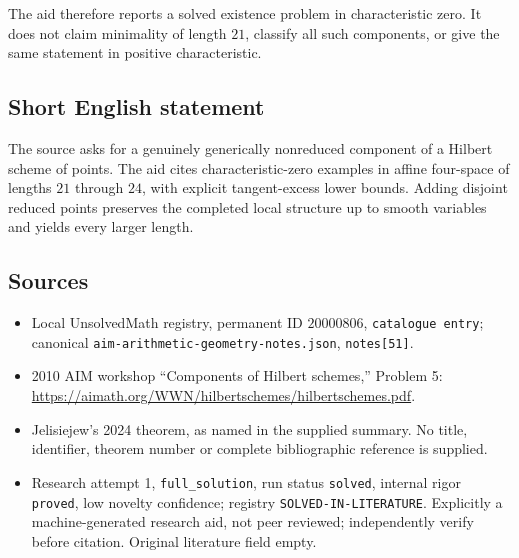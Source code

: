 \documentclass[11pt]{article}
\begin{document}
The aid therefore reports a solved existence problem in characteristic zero. It does not claim minimality of length $21$, classify all such components, or give the same statement in positive characteristic.
\subsection{Short English statement}
The source asks for a genuinely generically nonreduced component of a Hilbert scheme of points. The aid cites characteristic-zero examples in affine four-space of lengths $21$ through $24$, with explicit tangent-excess lower bounds. Adding disjoint reduced points preserves the completed local structure up to smooth variables and yields every larger length.
\subsection{Sources}
\begin{itemize}
\item Local UnsolvedMath registry, permanent ID $20000806$, \texttt{catalogue entry}; canonical \texttt{aim-arithmetic-geometry-notes.json}, \texttt{notes[51]}.
\item 2010 AIM workshop ``Components of Hilbert schemes,'' Problem 5: \url{https://aimath.org/WWN/hilbertschemes/hilbertschemes.pdf}.
\item Jelisiejew's 2024 theorem, as named in the supplied summary. No title, identifier, theorem number or complete bibliographic reference is supplied.
\item Research attempt 1, \texttt{full\_solution}, run status \texttt{solved}, internal rigor \texttt{proved}, low novelty confidence; registry \texttt{SOLVED-IN-LITERATURE}. Explicitly a machine-generated research aid, not peer reviewed; independently verify before citation. Original literature field empty.
\end{itemize}
\end{document}
